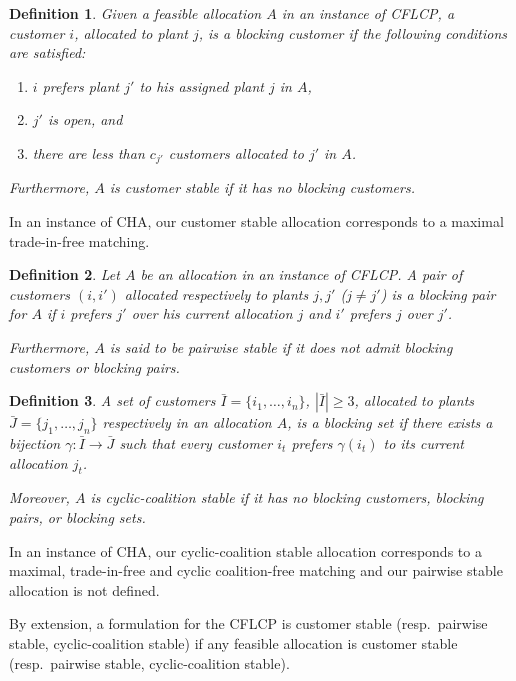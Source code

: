 \documentclass[preprint,11pt,authoryear]{elsarticle}
\newtheorem{defn}{Definition}
\begin{document}
\begin{defn} \label{def:blockingcustomer}
Given a feasible allocation $A$ in an instance of CFLCP, a customer $i$, allocated to plant $j$, is a \emph{blocking customer} if the following conditions are satisfied:
\begin{enumerate}
\item $i$ prefers plant $j'$ to his assigned plant $j$ in $A$, 

\item $j'$ is open, and

\item there are less than $c_{j'}$ customers allocated to $j'$ in $A$.
\end{enumerate}

Furthermore, $A$ is \emph{customer stable} if it has no blocking customers.
\end{defn}
In an instance of CHA, our customer stable allocation corresponds to a maximal trade-in-free matching.

\begin{defn}
Let $A$ be an allocation in an instance of CFLCP. A pair of customers $(i,i')$ allocated respectively to plants $j,j'$ ($j \neq j'$) is a \emph{blocking pair} for $A$ if $i$ prefers $j'$ over his current allocation $j$ and $i'$ prefers $j$ over $j'$. 

Furthermore, $A$ is said to be \emph{pairwise stable} if it does not admit blocking customers or blocking pairs.
\end{defn}
\begin{defn}
A set of customers $\bar{I}=\{i_1, \dots, i_n\}$, $|\bar{I}| \ge 3$, allocated to plants $\bar{J}=\{j_1, \dots, j_n\}$ respectively in an allocation $A$, is a \emph{blocking set} if there exists a bijection $\gamma: \bar{I} \rightarrow \bar{J}$ such that every customer $i_t$ prefers $\gamma(i_t)$ to its current allocation $j_t$.

Moreover, $A$ is \emph{cyclic-coalition stable} if it has no blocking customers, blocking pairs, or blocking sets.
\end{defn}

In an instance of CHA, our cyclic-coalition stable allocation corresponds to a maximal, trade-in-free and cyclic coalition-free matching and our pairwise stable allocation is not defined.

By extension, a formulation for the CFLCP is customer stable (resp.\ pairwise stable, cyclic-coalition stable) if any feasible allocation is customer stable (resp.\ pairwise stable, cyclic-coalition stable). 
\end{document}
